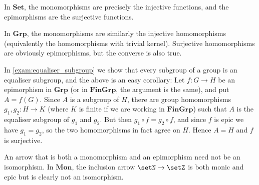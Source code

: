 \documentclass[article, a4paper, 11pt, oneside]{memoir}
\numberwithin{equation}{chapter}
\newcommand{\ncat}[1]{\mathbf{#1}} %
\newcommand{\catSet}{\ncat{Set}}
\newcommand{\catGrp}{\ncat{Grp}}
\newcommand{\catMon}{\ncat{Mon}}
\newcommand{\catFinGrp}{\ncat{FinGrp}}
\begin{document}
\begin{examplebreak}
    \begin{enumexample}
        \item In $\catSet$, the monomorphisms are precisely the injective functions, and the epimorphisms are the surjective functions.
        
        \item In $\catGrp$, the monomorphisms are similarly the injective homomorphisms (equivalently the homomorphisms with trivial kernel). Surjective homomorphisms are obviously epimorphisms, but the converse is also true.
        
        In \cref{exam:equaliser_subgroup} we show that every subgroup of a group is an equaliser subgroup, and the above is an easy corollary: Let $f \colon G \to H$ be an epimorphism in $\catGrp$ (or in $\catFinGrp$, the argument is the same), and put $A = f(G)$. Since $A$ is a subgroup of $H$, there are group homomorphisms $g_1, g_2 \colon H \to K$ (where $K$ is finite if we are working in $\catFinGrp$) such that $A$ is the equaliser subgroup of $g_1$ and $g_2$. But then $g_1 \circ f = g_2 \circ f$, and since $f$ is epic we have $g_1 = g_2$, so the two homomorphisms in fact agree on $H$. Hence $A = H$ and $f$ is surjective.

        \item An arrow that is both a monomorphism and an epimorphism need not be an isomorphism. In $\catMon$, the inclusion arrow $\setN \to \setZ$ is both monic and epic but is clearly not an isomorphism.
    \end{enumexample}
\end{examplebreak}


        
        

\end{document}
